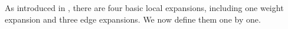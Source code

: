 \documentclass{article}
\newcommand{\1}{\mathds{1}}
\numberwithin{equation}{section}
\newcommand{\al}{\alpha}
\newcommand{\be}{\begin{equation}}
\newcommand{\ee}{\end{equation}}
\renewcommand{\cal}{\mathcal}
\theoremstyle{plain} %
\newtheorem{lemma}[theorem]{Lemma}
\theoremstyle{remark}
\begin{document}
%
% 
%
%  
%
%
%  
  
As introduced in \cite{PartI_high}, there are four basic local expansions, including one weight expansion and three edge expansions. We now define them one by one.  
\end{document}
